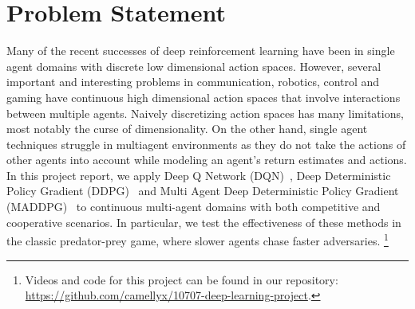 
\section{Problem Statement}
\label{sec:problem}

Many of the recent successes of deep reinforcement learning have been in
single agent domains with discrete low dimensional action spaces. However, 
several important and interesting problems in communication, robotics, control
and gaming have continuous high dimensional action spaces that involve interactions
between multiple agents. Naively discretizing action spaces has many limitations,
most notably the curse of dimensionality. On the other hand, single agent techniques
struggle in multiagent environments as they do not take the actions of other agents
into account while modeling an agent's return estimates and actions. In this project
report, we apply Deep Q Network (DQN)~\cite{mnih2016dqn}, Deep Deterministic Policy Gradient (DDPG)~\cite{lillicrap2016continuous} and Multi Agent Deep Deterministic Policy Gradient (MADDPG)~\cite{lowe2017multi} to continuous multi-agent
domains with both competitive and cooperative scenarios. In particular, we test the 
effectiveness of these methods in the classic predator-prey game, where slower agents 
chase faster adversaries. \footnote{Videos and code for this project can be found
in our repository: \url{https://github.com/camellyx/10707-deep-learning-project}.}
 
